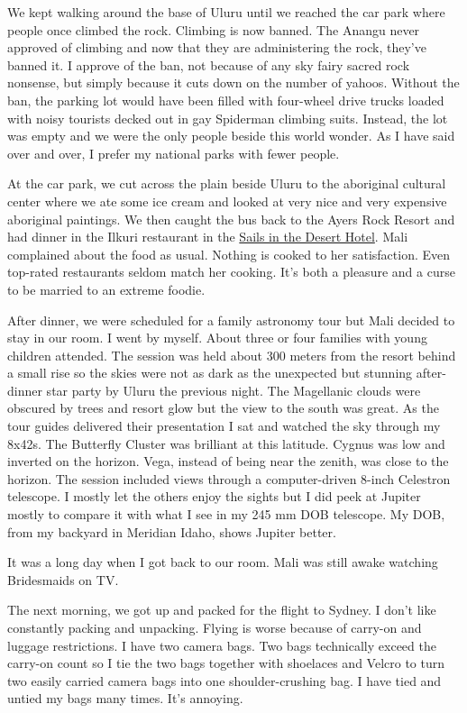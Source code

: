 We kept walking around the base of Uluru until we reached the car park where
people once climbed the rock. Climbing is now banned. The Anangu never
approved of climbing and now that they are administering the rock,
they've banned it. I approve of the ban, not because of any sky fairy
sacred rock nonsense, but simply because it cuts down on the number of
yahoos. Without the ban, the parking lot would have been filled with
four-wheel drive trucks loaded with noisy tourists decked out in gay
Spiderman climbing suits. Instead, the lot was empty and we were the
only people beside this world wonder. As I have said over and over, I
prefer my national parks with fewer people.

At the car park, we cut across the plain beside Uluru to the aboriginal
cultural center where we ate some ice cream and looked at very nice and
very expensive aboriginal paintings. We then caught the bus back to the
Ayers Rock Resort and had dinner in the Ilkuri restaurant in the
\href{https://www.ayersrockresort.com.au/accommodation/sails-in-the-desert}{Sails
in the Desert Hotel}. Mali complained about the food as usual. Nothing
is cooked to her satisfaction. Even top-rated restaurants seldom match
her cooking. It's both a pleasure and a curse to be married to an
extreme foodie.

After dinner, we were scheduled for a family astronomy tour but Mali
decided to stay in our room. I went by myself. About three or four
families with young children attended. The session was held about 300
meters from the resort behind a small rise so the skies were not as dark
as the unexpected but stunning after-dinner star party by Uluru the
previous night. The Magellanic clouds were obscured by trees and resort
glow but the view to the south was great. As the tour guides delivered
their presentation I sat and watched the sky through my 8x42s. The
Butterfly Cluster was brilliant at this latitude. Cygnus was low and
inverted on the horizon. Vega, instead of being near the zenith, was
close to the horizon. The session included views through a
computer-driven 8-inch Celestron telescope. I mostly let the others
enjoy the sights but I did peek at Jupiter mostly to compare it with
what I see in my 245 mm DOB telescope. My DOB, from my backyard in
Meridian Idaho, shows Jupiter better.

It was a long day when I got back to our room. Mali was still awake
watching Bridesmaids on TV.

The next morning, we got up and packed for the flight to Sydney. I don't
like constantly packing and unpacking. Flying is worse because of
carry-on and luggage restrictions. I have two camera bags. Two bags
technically exceed the carry-on count so I tie the two bags together
with shoelaces and Velcro to turn two easily carried camera bags into
one shoulder-crushing bag. I have tied and untied my bags many times.
It's annoying.

